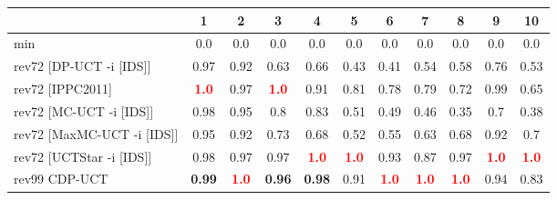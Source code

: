 \documentclass{article}
\begin{document}
\begin{tabular}{|l|r@{$\pm$}rr@{$\pm$}rr@{$\pm$}rr@{$\pm$}rr@{$\pm$}rr@{$\pm$}rr@{$\pm$}rr@{$\pm$}rr@{$\pm$}rr@{$\pm$}r|}
\hline

& \multicolumn{2}{c}{1}
& \multicolumn{2}{c}{2}
& \multicolumn{2}{c}{3}
& \multicolumn{2}{c}{4}
& \multicolumn{2}{c}{5}
& \multicolumn{2}{c}{6}
& \multicolumn{2}{c}{7}
& \multicolumn{2}{c}{8}
& \multicolumn{2}{c}{9}
& \multicolumn{2}{c|}{10}
\\
\hline
\hline
min
& \multicolumn{2}{c}{0.0}
& \multicolumn{2}{c}{0.0}
& \multicolumn{2}{c}{0.0}
& \multicolumn{2}{c}{0.0}
& \multicolumn{2}{c}{0.0}
& \multicolumn{2}{c}{0.0}
& \multicolumn{2}{c}{0.0}
& \multicolumn{2}{c}{0.0}
& \multicolumn{2}{c}{0.0}
& \multicolumn{2}{c|}{0.0}
\\
rev72 [DP-UCT -i [IDS]]
& \multicolumn{2}{c}{0.97}
& \multicolumn{2}{c}{0.92}
& \multicolumn{2}{c}{0.63}
& \multicolumn{2}{c}{0.66}
& \multicolumn{2}{c}{0.43}
& \multicolumn{2}{c}{0.41}
& \multicolumn{2}{c}{0.54}
& \multicolumn{2}{c}{0.58}
& \multicolumn{2}{c}{0.76}
& \multicolumn{2}{c|}{0.53}
\\
rev72 [IPPC2011]
& \multicolumn{2}{c}{\textbf{\textcolor{red}{1.0}}}
& \multicolumn{2}{c}{0.97}
& \multicolumn{2}{c}{\textbf{\textcolor{red}{1.0}}}
& \multicolumn{2}{c}{0.91}
& \multicolumn{2}{c}{0.81}
& \multicolumn{2}{c}{0.78}
& \multicolumn{2}{c}{0.79}
& \multicolumn{2}{c}{0.72}
& \multicolumn{2}{c}{0.99}
& \multicolumn{2}{c|}{0.65}
\\
rev72 [MC-UCT -i [IDS]]
& \multicolumn{2}{c}{0.98}
& \multicolumn{2}{c}{0.95}
& \multicolumn{2}{c}{0.8}
& \multicolumn{2}{c}{0.83}
& \multicolumn{2}{c}{0.51}
& \multicolumn{2}{c}{0.49}
& \multicolumn{2}{c}{0.46}
& \multicolumn{2}{c}{0.35}
& \multicolumn{2}{c}{0.7}
& \multicolumn{2}{c|}{0.38}
\\
rev72 [MaxMC-UCT -i [IDS]]
& \multicolumn{2}{c}{0.95}
& \multicolumn{2}{c}{0.92}
& \multicolumn{2}{c}{0.73}
& \multicolumn{2}{c}{0.68}
& \multicolumn{2}{c}{0.52}
& \multicolumn{2}{c}{0.55}
& \multicolumn{2}{c}{0.63}
& \multicolumn{2}{c}{0.68}
& \multicolumn{2}{c}{0.92}
& \multicolumn{2}{c|}{0.7}
\\
rev72 [UCTStar -i [IDS]]
& \multicolumn{2}{c}{0.98}
& \multicolumn{2}{c}{0.97}
& \multicolumn{2}{c}{0.97}
& \multicolumn{2}{c}{\textbf{\textcolor{red}{1.0}}}
& \multicolumn{2}{c}{\textbf{\textcolor{red}{1.0}}}
& \multicolumn{2}{c}{0.93}
& \multicolumn{2}{c}{0.87}
& \multicolumn{2}{c}{0.97}
& \multicolumn{2}{c}{\textbf{\textcolor{red}{1.0}}}
& \multicolumn{2}{c|}{\textbf{\textcolor{red}{1.0}}}
\\
\hline
rev99 CDP-UCT
& \multicolumn{2}{c}{\textbf{0.99}}
& \multicolumn{2}{c}{\textbf{\textcolor{red}{1.0}}}
& \multicolumn{2}{c}{\textbf{0.96}}
& \multicolumn{2}{c}{\textbf{0.98}}
& \multicolumn{2}{c}{0.91}
& \multicolumn{2}{c}{\textbf{\textcolor{red}{1.0}}}
& \multicolumn{2}{c}{\textbf{\textcolor{red}{1.0}}}
& \multicolumn{2}{c}{\textbf{\textcolor{red}{1.0}}}
& \multicolumn{2}{c}{0.94}
& \multicolumn{2}{c|}{0.83}
\\
\hline
\end{tabular}%
\end{document}
